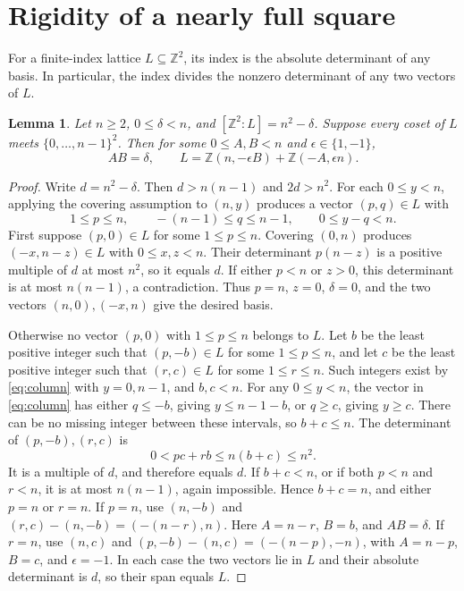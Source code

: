 \documentclass[11pt]{article}
\newtheorem{lemma}[theorem]{Lemma}
\newcommand{\Z}{\mathbb Z}
\begin{document}
\section{Rigidity of a nearly full square}
For a finite-index lattice $L\subseteq\Z^2$, its index is the absolute
determinant of any basis. In particular, the index divides the nonzero
determinant of any two vectors of $L$.

\begin{lemma}\label{lem:rigidity}
Let $n\ge2$, $0\le\delta<n$, and $[\Z^2:L]=n^2-\delta$.
Suppose every coset of $L$ meets $\{0,\ldots,n-1\}^2$.
Then for some $0\le A,B<n$ and $\epsilon\in\{1,-1\}$,
\[
AB=\delta,\qquad
L=\Z(n,-\epsilon B)+\Z(-A,\epsilon n).
\]
\end{lemma}
\begin{proof}
Write $d=n^2-\delta$. Then $d>n(n-1)$ and $2d>n^2$.
For each $0\le y<n$, applying the covering assumption to $(n,y)$
produces a vector $(p,q)\in L$ with
\begin{equation}\label{eq:column}
1\le p\le n,\qquad -(n-1)\le q\le n-1,\qquad 0\le y-q<n.
\end{equation}
First suppose $(p,0)\in L$ for some $1\le p\le n$.
Covering $(0,n)$ produces $(-x,n-z)\in L$ with $0\le x,z<n$.
Their determinant $p(n-z)$ is a positive multiple of $d$ at most $n^2$,
so it equals $d$. If either $p<n$ or $z>0$, this determinant is at most
$n(n-1)$, a contradiction. Thus $p=n$, $z=0$, $\delta=0$, and the
two vectors $(n,0),(-x,n)$ give the desired basis.

Otherwise no vector $(p,0)$ with $1\le p\le n$ belongs to $L$.
Let $b$ be the least positive integer such that $(p,-b)\in L$ for
some $1\le p\le n$, and let $c$ be the least positive integer such
that $(r,c)\in L$ for some $1\le r\le n$. Such integers exist by
\eqref{eq:column} with $y=0,n-1$, and $b,c<n$.
For any $0\le y<n$, the vector in \eqref{eq:column} has either
$q\le-b$, giving $y\le n-1-b$, or $q\ge c$, giving $y\ge c$.
There can be no missing integer between these intervals, so $b+c\le n$.
The determinant of $(p,-b),(r,c)$ is
\[
0<pc+rb\le n(b+c)\le n^2.
\]
It is a multiple of $d$, and therefore equals $d$.
If $b+c<n$, or if both $p<n$ and $r<n$, it is at most $n(n-1)$,
again impossible. Hence $b+c=n$, and either $p=n$ or $r=n$.
If $p=n$, use $(n,-b)$ and $(r,c)-(n,-b)=(-(n-r),n)$.
Here $A=n-r$, $B=b$, and $AB=\delta$.
If $r=n$, use $(n,c)$ and $(p,-b)-(n,c)=(-(n-p),-n)$,
with $A=n-p$, $B=c$, and $\epsilon=-1$.
In each case the two vectors lie in $L$ and their absolute determinant
is $d$, so their span equals $L$.
\end{proof}
\end{document}
